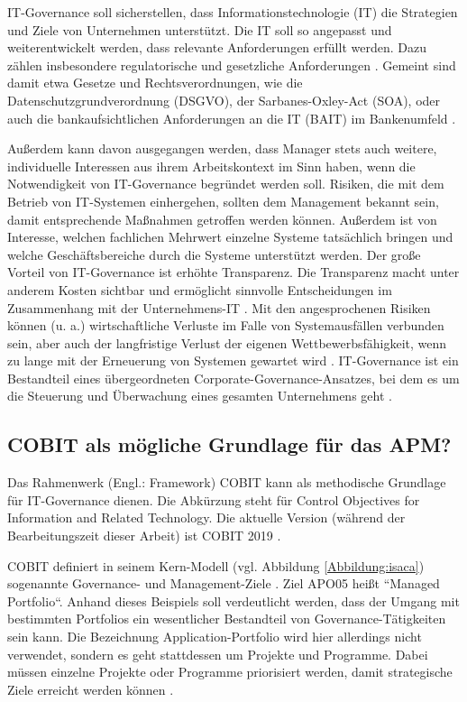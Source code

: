 IT-Governance soll sicherstellen, dass Informationstechnologie (IT) die Strategien und Ziele von Unternehmen unterstützt. Die IT soll so angepasst und weiterentwickelt werden, dass relevante Anforderungen erfüllt werden. Dazu zählen insbesondere regulatorische und gesetzliche Anforderungen \cite[S. 5]{reiss}. Gemeint sind damit etwa Gesetze und Rechtsverordnungen, wie die Datenschutzgrundverordnung (DSGVO), der Sarbanes-Oxley-Act (SOA), oder auch die bankaufsichtlichen Anforderungen an die IT (BAIT) im Bankenumfeld \cite[S. 274-275]{gaulke}. 

Außerdem kann davon ausgegangen werden, dass Manager stets auch weitere, individuelle Interessen aus ihrem Arbeitskontext im Sinn haben, wenn die Notwendigkeit von IT-Governance begründet werden soll. Risiken, die mit dem Betrieb von IT-Systemen einhergehen, sollten dem Management bekannt sein, damit entsprechende Maßnahmen getroffen werden können. Außerdem ist von Interesse, welchen fachlichen Mehrwert einzelne Systeme tatsächlich bringen und welche Geschäftsbereiche durch die Systeme unterstützt werden. Der große Vorteil von IT-Governance ist erhöhte Transparenz. Die Transparenz macht unter anderem Kosten sichtbar und ermöglicht sinnvolle Entscheidungen im Zusammenhang mit der Unternehmens-IT  \cite[S. 5-7]{ncc}. Mit den angesprochenen Risiken können (u. a.) wirtschaftliche Verluste im Falle von Systemausfällen verbunden sein, aber auch der langfristige Verlust der eigenen Wettbewerbsfähigkeit, wenn zu lange mit der Erneuerung von Systemen gewartet wird  \cite[S. 20]{ncc}. IT-Governance ist ein Bestandteil eines übergeordneten Corporate-Governance-Ansatzes, bei dem es um die Steuerung und Überwachung eines gesamten Unternehmens geht \cite[S. 2]{gaulke}. 

\subsection{COBIT als mögliche Grundlage für das APM?}

Das Rahmenwerk (Engl.: Framework) COBIT kann als methodische Grundlage für IT-Governance dienen. Die Abkürzung steht für Control Objectives for Information and Related Technology. Die aktuelle Version (während der Bearbeitungszeit dieser Arbeit) ist COBIT 2019 \cite[S. 9-12]{gaulke}. 

COBIT definiert in seinem Kern-Modell (vgl. Abbildung \ref{Abbildung:isaca}) sogenannte Governance- und Management-Ziele \cite[S. 67]{gaulke}. Ziel APO05 heißt ``Managed Portfolio``. Anhand dieses Beispiels soll verdeutlicht werden, dass der Umgang mit bestimmten Portfolios ein wesentlicher Bestandteil von Governance-Tätigkeiten sein kann. Die Bezeichnung Application-Portfolio wird hier allerdings nicht verwendet, sondern es geht stattdessen um Projekte und Programme. Dabei müssen einzelne Projekte oder Programme priorisiert werden, damit strategische Ziele erreicht werden können \cite[S. 87-92]{isaca1}. 


